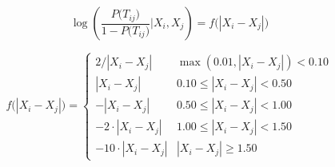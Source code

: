 \documentclass[12pt]{report}
\begin{document}
\begin{equation}
\label{eq:latentspace}
\log \left( \frac{P\big( T_{ij} \big) }{1 - P\big( T_{ij}    \big) } \big| X_i, X_j \right) = f \big( | X_i - X_j |  \big)
\end{equation}


\begin{equation}
\label{eq:model2}
f\big( |X_i - X_j| \big) = \left\{ \begin{array}{cc} 2 / |X_i - X_j| & \max(0.01, |X_i - X_j| ) < 0.10 \\ |X_{i} - X_{j}| & 0.10 \leq |X_{i}  - X_{j}| < 0.50 \\ - |X_{i} - X_{j}| &  0.50 \leq |X_{i}  - X_{j}| < 1.00  \\ - 2 \cdot |X_{i} - X_{j}| &  1.00 \leq |X_{i}  - X_{j}| < 1.50  \\ -10 \cdot |X_i - X_j| & |X_i - X_j| \geq 1.50 \end{array}  \right.
\end{equation}
\end{document}
